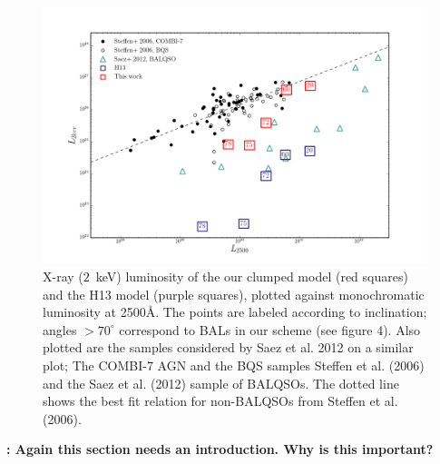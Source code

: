 \documentclass[preprint, a4paper, 11pt]{aastex}
\begin{document}
\begin{figure} %
\centering
\includegraphics[width=1.0\textwidth]{figures/lx.png}
\caption
{
X-ray ($2$~keV) luminosity of the our clumped model (red squares) 
and the H13 model (purple squares), plotted against monochromatic luminosity 
at 2500\AA. The points are labeled according to inclination; angles
$>70^\circ$ correspond to BALs in our scheme (see figure 4).
Also plotted are the samples considered by Saez et al. 2012 on a similar plot; 
The COMBI-7 AGN and the BQS samples Steffen et al. (2006) and the Saez et al. (2012) 
sample of BALQSOs. The dotted line shows the best fit relation for non-BALQSOs 
from Steffen et al. (2006).
}
\label{fig:xray}
\end{figure} %


{\bf:  Again this section needs an introduction.  Why is this important?}
\end{document}
